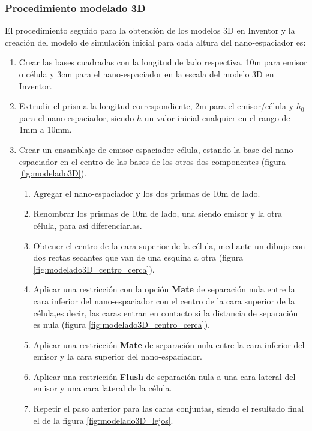\subsubsection{Procedimiento modelado 3D}
El procedimiento seguido para la obtención de los modelos 3D en Inventor y la creación del modelo de simulación inicial para cada altura del nano-espaciador es:
\begin{enumerate}
	\item Crear las bases cuadradas con la longitud de lado respectiva, 10m para emisor o célula y 3cm para el nano-espaciador en la escala del modelo 3D en Inventor. 
	\item Extrudir el prisma la longitud correspondiente, 2m para el emisor/célula y $h_0$ para el nano-espaciador, siendo $h$ un valor inicial cualquier en el rango de 1mm a 10mm.
	\item Crear un ensamblaje de emisor-espaciador-célula, estando la base del nano-espaciador en el centro de las bases de los otros dos componentes (figura \ref{fig:modelado3D}).
	\begin{enumerate}
		\item Agregar el nano-espaciador y los dos prismas de 10m de lado.
		\item Renombrar los prismas de 10m de lado, una siendo emisor y la otra célula, para así diferenciarlas.
		\item Obtener el centro de la cara superior de la célula, mediante un dibujo con dos rectas secantes que van de una esquina a otra (figura \ref{fig:modelado3D_centro_cerca}).
		\item Aplicar una restricción con la opción \textbf{Mate} de separación nula entre la cara inferior del nano-espaciador con el centro de la cara superior de la célula,es decir, las caras entran en contacto si la distancia de separación es nula (figura \ref{fig:modelado3D_centro_cerca}).
		\item Aplicar una restricción \textbf{Mate} de separación nula entre la cara inferior del emisor y la cara superior del nano-espaciador.
		\item Aplicar una restricción \textbf{Flush} de separación nula a una cara lateral del emisor y una cara lateral de la célula.
		\item Repetir el paso anterior para las caras conjuntas, siendo el resultado final el de la figura \ref{fig:modelado3D_lejos}.
	\end{enumerate}
\begin{figure}[H]
	\centering
	\begin{subfigure}[b]{0.3\textwidth}

\end{subfigure}
\end{figure}
\end{enumerate}
